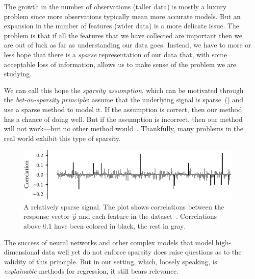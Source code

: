 The growth in the number of observations (taller data) is mostly a luxury problem since more observations typically mean more accurate models. But an expansion in the number of features (wider data) is a more delicate issue. The problem is that if all the features that we have collected are important then we are out of luck as far as understanding our data goes. Instead, we have to more or less hope that there is a \emph{sparse} representation of our data that, with some acceptable loss of information, allows us to make sense of the problem we are studying.

We can call this hope the \emph{sparsity assumption}, which can be motivated through the \emph{bet-on-sparsity} \emph{principle}: assume that the underlying signal is sparse~() and use a sparse method to model it. If the assumption is correct, then our method has a chance of doing well. But if the assumption is incorrect, then our method will not work---but no other method would~\parencite{hastie2009}. Thankfully, many problems in the real world exhibit this type of sparsity.

\begin{figure}[pb]
  \centering
  \includegraphics[]{figures/sparse-signal.pdf}
  \caption{%
    A relatively sparse signal. The plot shows correlations between the response vector \(\vec{y}\) and each feature in the  dataset~\parencite{guyon2004}. Correlations above 0.1 have been colored in black, the rest in gray.
  }
  \label{fig:sparse-signal}
\end{figure}

The success of neural networks and other complex models that model high-dimensional data well yet do not enforce sparsity does raise questions as to the validity of this principle. But in our setting, which, loosely speaking, is \emph{explainable} methods for regression, it still bears relevance.

